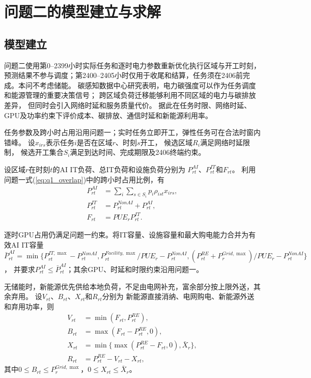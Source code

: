 \section{问题二的模型建立与求解}

\subsection{模型建立}

问题二使用第0--2399小时实际任务和逐时电力参数重新优化执行区域与开工时刻，预测结果不参与调度；第2400--2405小时仅用于收尾和结算，任务须在2406前完成。本问不考虑储能。
碳感知数据中心研究表明，电力碳强度可以作为任务调度和能源管理的重要决策信号\cite{ref5}；
跨区域负荷迁移能够利用不同区域的电力与碳排放差异，
但同时会引入网络时延和服务质量代价\cite{ref6}。
据此在任务时限、网络时延、GPU及功率约束下评价成本、碳排放、通信时延和新能源利用率。

任务参数及跨小时占用沿用问题一；实时任务立即开工，弹性任务可在合法时窗内错峰。
设$x_{irs}$表示任务$i$是否在区域$r$、时刻$s$开工，
候选区域$R_i$满足网络时延限制，
候选开工集合$S_i$满足到达时间、完成期限及2406终端约束。

设区域$r$在时刻$t$的AI IT负荷、总IT负荷和设施负荷分别为
$P^{AI}_{rt}$、$P^{IT}_{rt}$和$F_{rt}$。
利用问题一式(\ref{eq:q1_overlap})中的跨小时占用比例，有
\begin{equation}
	\begin{aligned}
		P^{AI}_{rt}
		&=
		\sum_i\sum_{s\in S_i}
		p_i\rho_{ist}x_{irs},\\
		P^{IT}_{rt}
		&=
		P^{NonAI}_{rt}+P^{AI}_{rt},\\
		F_{rt}
		&=
		PUE_rP^{IT}_{rt}.
	\end{aligned}
	\label{eq:q2_load_mapping}
\end{equation}

逐时GPU占用仍满足问题一约束。将IT容量、设施容量和最大购电能力合并为有效AI IT容量
$\bar P^{AI}_{rt}
=\min\{P^{IT,\max}_{rt}-P^{NonAI}_{rt},
P^{Facility,\max}_{rt}/PUE_r-P^{NonAI}_{rt},
(P^{RE}_{rt}+P_r^{Grid,\max})/PUE_r-P^{NonAI}_{rt}\}$，
并要求$P^{AI}_{rt}\leq\bar P^{AI}_{rt}$；其余GPU、时延和时限约束沿用问题一。

无储能时，新能源优先供给本地负荷，不足由电网补充，富余部分按上限外送，其余弃用。
设$V_{rt}$、$B_{rt}$、$X_{rt}$和$R_{rt}$分别为
新能源直接消纳、电网购电、新能源外送和弃用功率，则
\begin{equation}
	\begin{aligned}
		V_{rt}&=\min(F_{rt},P^{RE}_{rt}),\\
		B_{rt}&=\max(F_{rt}-P^{RE}_{rt},0),\\
		X_{rt}&=\min\{\max(P^{RE}_{rt}-F_{rt},0),\bar X_r\},\\
		R_{rt}&=P^{RE}_{rt}-V_{rt}-X_{rt},
	\end{aligned}
	\label{eq:q2_energy}
\end{equation}
其中$0\leq B_{rt}\leq P_r^{Grid,\max}$，$0\leq X_{rt}\leq\bar X_r$。

